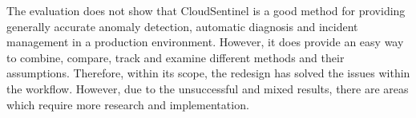 The evaluation does not show that CloudSentinel is a good method for providing generally accurate anomaly detection, automatic diagnosis and incident management in a production environment. However, it does provide an easy way to combine, compare, track and examine different methods and their assumptions. Therefore, within its scope, the redesign has solved the issues within the workflow. However, due to the unsuccessful and mixed results, there are areas which require more research and implementation.